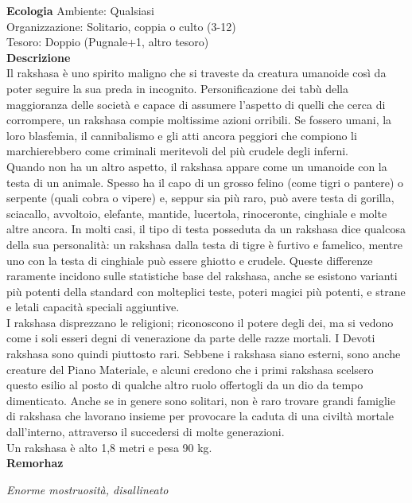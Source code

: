\begin{multicols}{2}
\textbf{Ecologia}
Ambiente: Qualsiasi\\
Organizzazione: Solitario, coppia o culto (3-12)\\
Tesoro: Doppio (Pugnale+1, altro tesoro)\\
\textbf{Descrizione}\\
Il rakshasa è uno spirito maligno che si traveste da creatura umanoide così da poter seguire la sua preda in incognito. Personificazione dei tabù della maggioranza delle società e capace di assumere l'aspetto di quelli che cerca di corrompere, un rakshasa compie moltissime azioni orribili. Se fossero umani, la loro blasfemia, il cannibalismo e gli atti ancora peggiori che compiono li marchierebbero come criminali meritevoli del più crudele degli inferni.\\
Quando non ha un altro aspetto, il rakshasa appare come un umanoide con la testa di un animale. Spesso ha il capo di un grosso felino (come tigri o pantere) o serpente (quali cobra o vipere) e, seppur sia più raro, può avere testa di gorilla, sciacallo, avvoltoio, elefante, mantide, lucertola, rinoceronte, cinghiale e molte altre ancora. In molti casi, il tipo di testa posseduta da un rakshasa dice qualcosa della sua personalità: un rakshasa dalla testa di tigre è furtivo e famelico, mentre uno con la testa di cinghiale può essere ghiotto e crudele. Queste differenze raramente incidono sulle statistiche base del rakshasa, anche se esistono varianti più potenti della standard con molteplici teste, poteri magici più potenti, e strane e letali capacità speciali aggiuntive.\\
I rakshasa disprezzano le religioni; riconoscono il potere degli dei, ma si vedono come i soli esseri degni di venerazione da parte delle razze mortali. I Devoti rakshasa sono quindi piuttosto rari. Sebbene i rakshasa siano esterni, sono anche creature del Piano Materiale, e alcuni credono che i primi rakshasa scelsero questo esilio al posto di qualche altro ruolo offertogli da un dio da tempo dimenticato. Anche se in genere sono solitari, non è raro trovare grandi famiglie di rakshasa che lavorano insieme per provocare la caduta di una civiltà mortale dall'interno, attraverso il succedersi di molte generazioni.\\
Un rakshasa è alto 1,8 metri e pesa 90 kg.\\


\medskip{}\textbf{Remorhaz}

\emph{Enorme mostruosità, disallineato}


\end{multicols}
